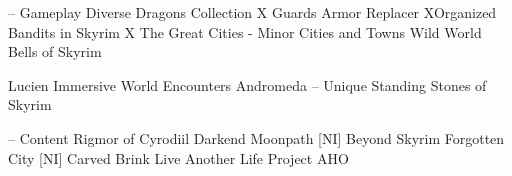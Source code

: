 -- Gameplay
Diverse Dragons Collection
X Guards Armor Replacer
XOrganized Bandits in Skyrim
X The Great Cities - Minor Cities and Towns
Wild World
Bells of Skyrim

Lucien
Immersive World Encounters
Andromeda – Unique Standing Stones of Skyrim

-- Content
Rigmor of Cyrodiil
Darkend
Moonpath
[NI] Beyond Skyrim
Forgotten City 
[NI] Carved Brink 
Live Another Life
Project AHO